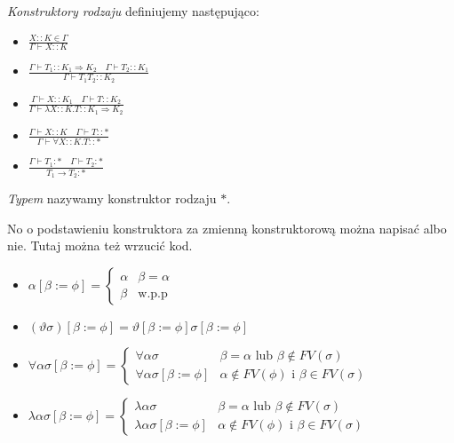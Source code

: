 \documentclass[11pt,leqno]{article}
\begin{document}
\emph{Konstruktory rodzaju} definiujemy następująco:
    \begin{itemize}
        \item $\frac{X::K \in \Gamma}{\Gamma \vdash X::K}$
        \item $\frac{\Gamma \vdash T_1 :: K_{1} \Rightarrow K_{2} \hspace{1em} \Gamma \vdash T_2 :: K_{1}}{\Gamma \vdash T_1 T_2 :: K_{2}}$
        \item $\frac{\Gamma \vdash X :: K_1 \hspace{1em} \Gamma \vdash T :: K_2}{\Gamma \vdash \lambda X::K. T :: K_{1} \Rightarrow K_{2}}$
        \item $\frac{\Gamma \vdash X :: K \hspace{1em} \Gamma \vdash T :: \ast}{\Gamma \vdash \forall X::K. T :: \ast}$
        \item $\frac{\Gamma \vdash T_1 : \ast \hspace{1em} \Gamma \vdash T_2 : \ast}{T_1 \rightarrow T_2 : \ast}$
    \end{itemize}


\begin{theorem}
\emph{Typem} nazywamy konstruktor rodzaju $\ast$.
\end{theorem}

\begin{theorem}
No o podstawieniu konstruktora za zmienną konstruktorową można napisać albo nie. Tutaj można też wrzucić kod.
    \begin{itemize}
        \item $\alpha [\beta := \phi]= \begin{cases}  \alpha & \beta=\alpha \\ \beta & \text{w.p.p} \end{cases}$
        \item $(\vartheta \sigma) [\beta := \phi] = \vartheta [\beta := \phi] \sigma [\beta := \phi]$
        \item $\forall \alpha \sigma [\beta := \phi]= \begin{cases} \forall \alpha \sigma & \beta=\alpha \text{ lub } \beta \notin FV(\sigma)\\ \forall \alpha \sigma [\beta := \phi] & \alpha \notin FV(\phi)  \text{ i } \beta \in FV(\sigma) \end{cases}$
        \item $\lambda \alpha \sigma [\beta := \phi]= \begin{cases} \lambda \alpha \sigma & \beta=\alpha \text{ lub } \beta \notin FV(\sigma)\\ \lambda \alpha \sigma [\beta := \phi] & \alpha \notin FV(\phi)  \text{ i } \beta \in FV(\sigma) \end{cases}$
    \end{itemize}
\end{theorem}
\end{document}
